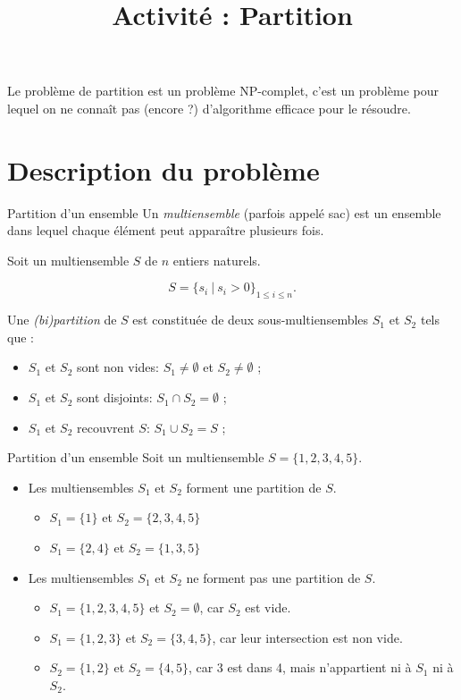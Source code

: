 \documentclass[11pt]{article}
\title{Activité : Partition}
\date{}
\begin{document}
  \maketitle

  Le problème de partition \cite{PP} est un problème NP-complet, c'est un problème pour lequel on ne connaît pas (encore ?) d'algorithme efficace pour le résoudre.

  \section{Description du problème}
  
  \begin{definition}{Partition d'un ensemble}
    Un \emph{multiensemble} (parfois appelé sac) est un ensemble dans lequel chaque élément peut apparaître plusieurs fois. 

    Soit un multiensemble $S$ de $n$ entiers naturels. 

    $$S = \{s_i\ |\ s_i > 0\}_{1\leq i \leq n}.$$

    Une \emph{(bi)partition} de $S$ est constituée de deux sous-multiensembles $S_1$ et $S_2$ tels que :
    \begin{itemize}
      \item $S_1$ et $S_2$ sont non vides:  $S_1 \neq \emptyset$ et $S_2 \neq \emptyset$ ;
      \item $S_1$ et $S_2$ sont disjoints:  $S_1 \cap S_2 = \emptyset$ ;
      \item $S_1$ et $S_2$ recouvrent $S$:  $S_1 \cup S_2 = S$ ;
    \end{itemize}
  \end{definition}

  \begin{exemple}{Partition d'un ensemble}
    Soit un multiensemble $S = \{1,2,3,4,5\}$. 

    \begin{itemize}
      \item Les multiensembles $S_1$ et $S_2$ forment une partition de $S$.
        \begin{itemize}
          \item $S_1 = \{1\}$ et $S_2 = \{2,3,4,5\}$
          \item $S_1 = \{2, 4\}$ et $S_2 = \{1,3,5\}$
        \end{itemize}
      \item Les multiensembles $S_1$ et $S_2$ ne forment pas une partition de $S$.
        \begin{itemize}
          \item $S_1 = \{1,2,3,4,5\}$ et $S_2 = \emptyset$, car $S_2$ est vide.
          \item $S_1 = \{1,2,3\}$ et $S_2 = \{3,4,5\}$, car leur intersection est non vide.
          \item $S_2 = \{1,2\}$ et $S_2 = \{4, 5\}$, car 3 est dans 4, mais n'appartient ni à $S_1$ ni à $S_2$. 
        \end{itemize}
    \end{itemize}
  \end{exemple}
  
\end{document}
